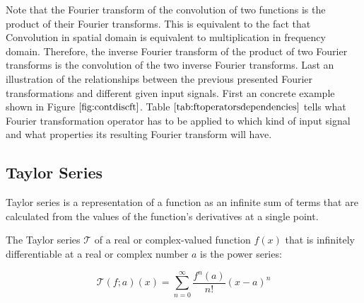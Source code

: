 Note that the Fourier transform of the convolution of two functions is the product of their Fourier transforms. This is equivalent to the fact that Convolution in spatial domain is equivalent to multiplication in frequency domain. Therefore, the inverse Fourier transform of the product of two Fourier transforms is the convolution of the two inverse Fourier transforms.
Last an illustration of the relationships between the previous presented Fourier transformations and different given input signals. First an concrete example shown in Figure $\ref{fig:contdiscft}$. Table $\ref{tab:ftoperatorsdependencies}$ tells what Fourier transformation operator has to be applied to which kind of input signal and what properties its resulting Fourier transform will have.

\subsection{Taylor Series}
Taylor series is a representation of a function as an infinite sum of terms that are calculated from the values of the function's derivatives at a single point.

The Taylor series $\mathcal T$ of a real or complex-valued function $f(x)$ that is infinitely differentiable at a real or complex number $a$ is the power series:

\begin{equation}
  \mathcal T(f;a)(x) = \sum_{n=0}^{\infty} \frac{f^{n}(a)}{n!}(x-a)^n
  \label{eq:deftaylor}
\end{equation}
